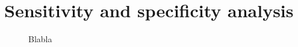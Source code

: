 \documentclass[\relativeRoot/main.tex]{subfiles}
\begin{document}
\section{Sensitivity and specificity analysis}
\label{sec:dataset_clb:sens_spec_analysis}

\begin{figure}
    \centering
    \def\svgwidth{1.0\textwidth}
    
    \caption[
        Sensitivity and specificity analysis of the CLB dataset
    ]{
        Blabla
    }
\end{figure}
\end{document}
